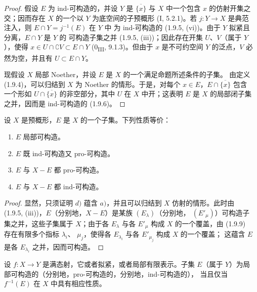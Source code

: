 \begin{proof}
假设 $E$ 为 ind-可构造的，并设 $Y$ 是 $\overline{\{x\}}$ 与 $X$ 中一个包含
$x$ 的仿射开集之交；因而存在 $X$ 的一个以 $Y$ 为底空间的子预概形
(I, 5.2.1)。若 $j:Y\to X$ 是典范注入，则 $E\cap Y=j^{-1}(E)$ 在 $Y$ 中
为 ind-可构造的 (1.9.5, (vi))。由于 $Y$ 拟紧且分离，$E\cap Y$ 是 $Y$ 的
可构造子集之并 (1.9.5, (iii))；因此存在开集 $U$、$V$（属于 $Y$），使得
$x\in U\cap\complement V\subset E\cap Y$
(0\textsubscript{III}, 9.1.3)。但由于 $x$ 是不可约空间 $Y$ 的泛点，$V$
必然为空，并且有 $U\subset E\cap Y$。

现假设 $X$ 局部 Noether，并设 $E$ 是 $X$ 的一个满足命题所述条件的子集。
由定义 (1.9.4)，可以归结到 $X$ 为 Noether 的情形。于是，对每个
$x\in E$，$E\cap\overline{\{x\}}$ 包含一个形如
$U\cap\overline{\{x\}}$ 的非空部分，其中 $U$ 在 $X$ 中开；这表明 $E$
是 $X$ 的局部闭子集之并，因而是 ind-可构造的 (1.9.6)。
\end{proof}

\begin{proposition}[1.9.11]
\label{IV.1.9.11-fr}
设 $X$ 是预概形，$E$ 是 $X$ 的一个子集。下列性质等价：
\begin{enumerate}
  \item[a)] $E$ 局部可构造。
  \item[b)] $E$ 既 ind-可构造又 pro-可构造。
  \item[c)] $E$ 与 $X-E$ 都 pro-可构造。
  \item[d)] $E$ 与 $X-E$ 都 ind-可构造。
\end{enumerate}
\end{proposition}

\begin{proof}
显然，只须证明 $d)$ 蕴含 $a)$，并且可以归结到 $X$ 仿射的情形。此时由
(1.9.5, (iii))，$E$（分别地，$X-E$）是某族 $(E_\lambda)$（分别地，
$(E'_\mu)$）可构造子集之并，这些子集属于 $X$；由于各 $E_\lambda$ 与各
$E'_\mu$ 构成 $X$ 的一个覆盖，由 (1.9.9) 存在有限多个指标 $\lambda_i$、
$\mu_j$，使得各 $E_{\lambda_i}$ 与各 $E'_{\mu_j}$ 构成 $X$ 的一个覆盖；
这蕴含 $E$ 是各 $E_{\lambda_i}$ 之并，因而可构造。
\end{proof}

\begin{corollary}[1.9.12]
\label{IV.1.9.12-fr}
设 $f:X\to Y$ 是满态射，它或者拟紧，或者局部有限表示。子集 $E$（属于
$Y$）为局部可构造的（分别地，pro-可构造的，分别地，ind-可构造的），
当且仅当 $f^{-1}(E)$ 在 $X$ 中具有相应性质。
\end{corollary}


